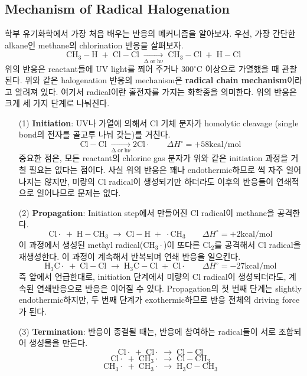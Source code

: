 \documentclass[a4paper, 9pt]{article}
\begin{document}
\subsection{Mechanism of Radical Halogenation}
학부 유기화학에서 가장 처음 배우는 반응의 메커니즘을 알아보자. 우선, 가장 간단한 alkane인 methane의 chlorination 반응을 살펴보자.
\[ \mathrm{ CH_{3}-H\;+\;Cl-Cl\;\xrightarrow[\Delta\;\text{or}\;h\nu]{}\;CH_{3}-Cl\;+\;H-Cl } \]
위의 반응은 reactant들에 UV light를 쬐어 주거나 300$^{\circ}$C 이상으로 가열했을 때 관찰된다. 위와 같은 halogenation 반응의 mechanism은 \textbf{radical chain mechanism}이라고 알려져 있다. 여기서 radical이란 홀전자를 가지는 화학종을 의미한다. 위의 반응은 크게 세 가지 단계로 나눠진다.
\begin{itemize}
	\item[(1)] \textbf{Initiation}: UV나 가열에 의해서 Cl 기체 분자가 homolytic cleavage (single bond의 전자를 골고루 나눠 갖는)를 거친다.
	\[ \mathrm{ Cl-Cl\;\xrightarrow[\Delta\;\text{or}\;h\nu]{}2Cl\cdot\qquad}\Delta{H}^{\circ}=+58\text{kcal/mol} \]
	중요한 점은, 모든 reactant의 chlorine gas 분자가 위와 같은 initiation 과정을 거칠 필요는 없다는 점이다. 사실 위의 반응은 꽤나 endothermic하므로 썩 자주 일어나지는 않지만, 미량의 Cl radical이 생성되기만 하더라도 이후의 반응들이 연쇄적으로 일어나므로 문제는 없다.
	\item[(2)] \textbf{Propagation}: Initiation step에서 만들어진 Cl radical이 methane을 공격한다.
	\[ \mathrm{ Cl\cdot \;+\; H-CH_{3}\;\rightarrow\;Cl-H\;+\; \cdot{C}H_{3}\qquad}\Delta{H}^{\circ}=+2\text{kcal/mol} \]
	이 과정에서 생성된 methyl radical($\mathrm{CH_{3}\cdot}$)이 또다른 $\mathrm{Cl_{2}}$를 공격해서 Cl radical을 재생성한다. 이 과정이 계속해서 반복되며 연쇄 반응을 일으킨다.
	\[ \mathrm{ H_{3}C\cdot\;+\;Cl-Cl\;\rightarrow\;H_{3}C-Cl\;+\;Cl\cdot\qquad}\Delta{H}^{\circ}=-27\text{kcal/mol} \]
	즉 앞에서 언급한대로, initiation 단계에서 미량의 Cl radical이 생성되더라도, 계속된 연쇄반응으로 반응은 이어질 수 있다. Propagation의 첫 번째 단계는 slightly endothermic하지만, 두 번째 단계가 exothermic하므로 반응 전체의 driving force가 된다.
	\item[(3)] \textbf{Termination}: 반응이 종결될 때는, 반응에 참여하는 radical들이 서로 조합되어 생성물을 만든다.
	\[ \mathrm{Cl\cdot\;+\;Cl\cdot\;\rightarrow\;Cl-Cl} \]
	\[ \mathrm{Cl\cdot\;+\;CH_{3}\cdot\;\rightarrow\;Cl-CH_{3}} \]
	\[ \mathrm{CH_{3}\cdot\;+\;CH_{3}\cdot\;\rightarrow\;H_{3}C-CH_{3}} \]
\end{itemize}
\end{document}
